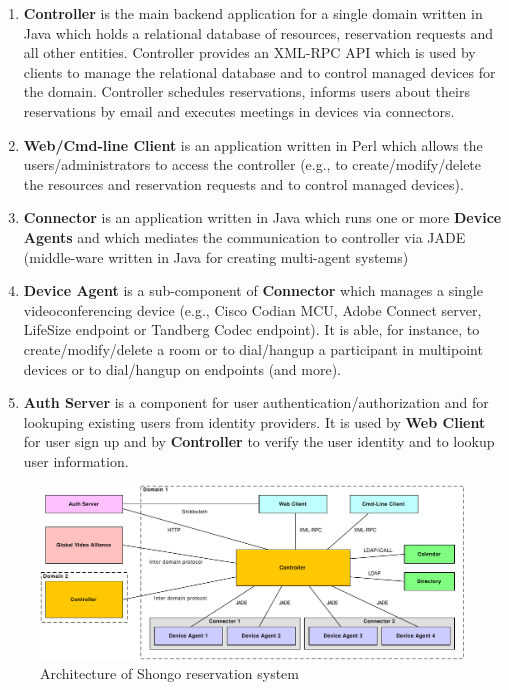 \begin{enumerate}

\item \textbf{Controller} is the main backend application for a single domain written in Java which holds a relational database of resources, reservation requests and all other entities. Controller provides an XML-RPC API which is used by clients to manage the relational database and to control managed devices for the domain. Controller schedules reservations, informs users about theirs reservations by email and executes meetings in devices via connectors.

\item \textbf{Web/Cmd-line Client} is an application written in Perl which allows the users/administrators to access the controller (e.g., to create/modify/delete the resources and reservation requests and to control managed devices).

\item \textbf{Connector} is an application written in Java which runs one or more \textbf{Device Agents} and which mediates the communication to controller via JADE (middle-ware written in Java for creating multi-agent systems)

\item \textbf{Device Agent} is a sub-component of \textbf{Connector} which manages a single videoconferencing device (e.g., Cisco Codian MCU, Adobe Connect server, LifeSize endpoint or Tandberg Codec endpoint). It is able, for instance, to create/modify/delete a room or to dial/hangup a participant in multipoint devices or to dial/hangup on endpoints (and more).

\item \textbf{Auth Server} is a component for user authentication/authorization and for lookuping existing users from identity providers. It is used by \textbf{Web Client} for user sign up and by \textbf{Controller} to verify the user identity and to lookup user information.

\end{enumerate}

\begin{figure}[ht!]
\includegraphics[width=\textwidth]{diagrams/dd_architecture}
\caption{Architecture of Shongo reservation system}
\label{fig:architecture}
\end{figure}

